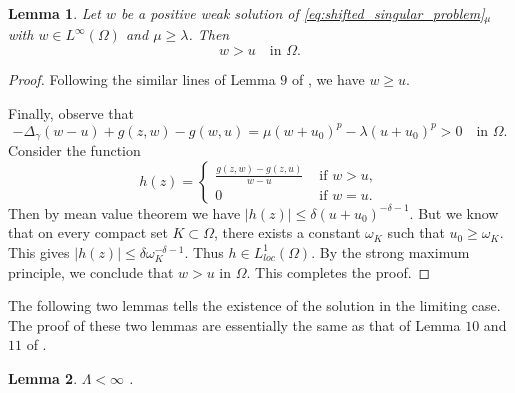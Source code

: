 \documentclass[11pt]{article}
\newtheorem{lemma}{Lemma}[section] %
\newcommand{\om} {\Omega}
\newcommand{\Gr}{\Delta_{\gamma}}
\begin{document}

\begin{lemma}
Let $w$ be a positive weak solution of \eqref{eq:shifted_singular_problem}$_\mu$ with $w \in L^\infty(\Omega)$ and $\mu \ge \lambda$. Then
\begin{equation*}
w > u \quad \text{in } \Omega .
\end{equation*}
\end{lemma}

\begin{proof}
Following the similar lines of Lemma $9$ of \cite{hirano_fully_singular}, we have $w \geq u$. 

Finally, observe that
\begin{equation*}
-\Gr  (w-u) + g(z,w) - g(w,u)
=
\mu (w+u_{0})^p - \lambda (u+u_{0})^p
> 0
\quad \text{in } \Omega .
\end{equation*}
Consider the function 
\begin{equation*}
    h(z) = 
    \begin{cases}
        \frac{g(z,w) - g(z,u)}{w-u} & \text{ if } w> u, \\
        0 & \text{ if } w = u. 
    \end{cases}
\end{equation*}
Then by mean value theorem we have $|h(z)| \leq \delta (u + u_{0})^{-\delta-1}$. But we know that on every compact set $K \subset \om$, there exists a constant $\omega_K$ such that $u_{0} \geq \omega_K$. This gives $|h(z)| \leq \delta \omega_K^{-\delta-1}$. Thus $h \in L_{loc}^{1}(\om)$. By the strong maximum principle, we conclude that $w>u$ in $\Omega$. This completes the proof.
\end{proof}


The following two lemmas tells the existence of the solution in the limiting case. The proof of these two lemmas are essentially the same as that of Lemma $10$ and $11$ of \cite{hirano_fully_singular}.
\begin{lemma}
$\Lambda < \infty$ .
\end{lemma}

\end{document}
